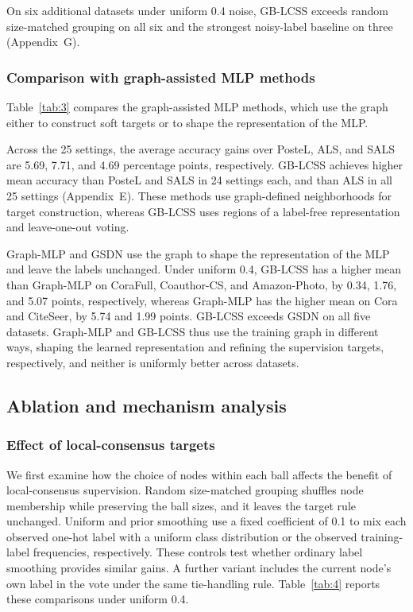 \documentclass[10pt,letterpaper,nopreprintline]{elsarticle}
\theoremstyle{definition}
\theoremstyle{plain}
\begin{document}
On six additional datasets under uniform 0.4 noise, GB-LCSS exceeds random size-matched grouping on all six and the strongest noisy-label baseline on three (Appendix~G).

\subsubsection{Comparison with graph-assisted MLP methods}\label{sec:4.2.2}

Table~\ref{tab:3} compares the graph-assisted MLP methods, which use the graph either to construct soft targets or to shape the representation of the MLP.



Across the 25 settings, the average accuracy gains over PosteL, ALS, and SALS are 5.69, 7.71, and 4.69 percentage points, respectively. GB-LCSS achieves higher mean accuracy than PosteL and SALS in 24 settings each, and than ALS in all 25 settings (Appendix~E). These methods use graph-defined neighborhoods for target construction, whereas GB-LCSS uses regions of a label-free representation and leave-one-out voting.

Graph-MLP and GSDN use the graph to shape the representation of the MLP and leave the labels unchanged. Under uniform 0.4, GB-LCSS has a higher mean than Graph-MLP on CoraFull, Coauthor-CS, and Amazon-Photo, by 0.34, 1.76, and 5.07 points, respectively, whereas Graph-MLP has the higher mean on Cora and CiteSeer, by 5.74 and 1.99 points. GB-LCSS exceeds GSDN on all five datasets. Graph-MLP and GB-LCSS thus use the training graph in different ways, shaping the learned representation and refining the supervision targets, respectively, and neither is uniformly better across datasets.

\subsection{Ablation and mechanism analysis}\label{sec:4.3}

\subsubsection{Effect of local-consensus targets}\label{sec:4.3.1}

We first examine how the choice of nodes within each ball affects the benefit of local-consensus supervision. Random size-matched grouping shuffles node membership while preserving the ball sizes, and it leaves the target rule unchanged. Uniform and prior smoothing use a fixed coefficient of 0.1 to mix each observed one-hot label with a uniform class distribution or the observed training-label frequencies, respectively. These controls test whether ordinary label smoothing provides similar gains. A further variant includes the current node's own label in the vote under the same tie-handling rule. Table~\ref{tab:4} reports these comparisons under uniform 0.4.
\end{document}
